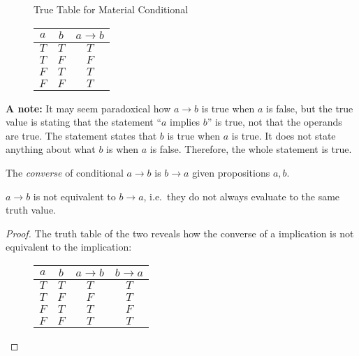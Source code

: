 \begin{figure}[H]
    \centering
    True Table for Material Conditional
    
    \begin{tabular}{ccc}
        \(a\) & \(b\) & \(a\rightarrow b\) \\
        \hline
        \(T\) & \(T\) & \(T\) \\
        \(T\) & \(F\) & \(F\) \\
        \(F\) & \(T\) & \(T\) \\
        \(F\) & \(F\) & \(T\)
    \end{tabular}
\end{figure}

\textbf{A note:} It may seem paradoxical how \(a\rightarrow b\) is true when \(a\) is false, but the true value is stating that the statement ``\(a\) implies \(b\)''
is true, not that the operands are true. The statement states that \(b\) is true when \(a\) is true. It does not state anything about what \(b\) is when \(a\) is false.
Therefore, the whole statement is true.

\bigskip
\begin{definition}
    The \emph{converse} of conditional \(a\rightarrow b\) is \(b\rightarrow a\) given propositions \(a,b\).
\end{definition}

\begin{proposition}
    \(a\rightarrow b\) is not equivalent to \(b\rightarrow a\), i.e.\ they do not always evaluate to the same truth value.
\end{proposition}
\begin{proof}
    The truth table of the two reveals how the converse of a implication is not equivalent to the implication:
    \begin{figure}[H]
        \centering
        \begin{tabular}{cccc}
            \(a\) & \(b\) & \(a\rightarrow b\) & \(b\rightarrow a\) \\
            \hline
            \(T\) & \(T\) & \(T\) & \(T\) \\
            \(T\) & \(F\) & \(F\) & \(T\) \\
            \(F\) & \(T\) & \(T\) & \(F\) \\
            \(F\) & \(F\) & \(T\) & \(T\)
        \end{tabular}
    \end{figure}
\end{proof}

